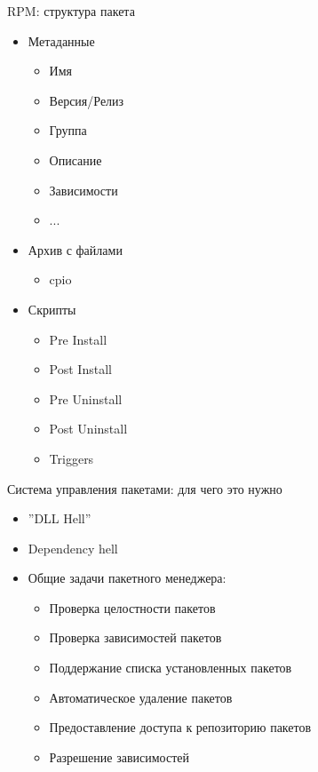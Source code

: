 \begin{frame}{RPM: структура пакета}
	\begin{itemize}
		\item Метаданные
			\begin{itemize}
				\item Имя
				\item Версия/Релиз
				\item Группа
				\item Описание
                                \item Зависимости
				\item ...
			\end{itemize}
		\item Архив с файлами
			\begin{itemize}
				\item cpio
			\end{itemize}
		\item Скрипты
			\begin{itemize}
				\item Pre Install
				\item Post Install
				\item Pre Uninstall
				\item Post Uninstall \bigskip
				\item Triggers
			\end{itemize}
	\end{itemize}
\end{frame}

\begin{frame}{Система управления пакетами: для чего это нужно}
\begin{itemize}
 \item ''DLL Hell''
 \item Dependency hell
 \item Общие задачи пакетного менеджера:
   \begin{itemize}
     \item Проверка целостности пакетов
     \item Проверка зависимостей пакетов
        \item Поддержание списка установленных пакетов
        \item Автоматическое удаление пакетов
     \item Предоставление доступа к репозиторию пакетов
     \item Разрешение зависимостей
   \end{itemize}
\end{itemize}
\end{frame}

